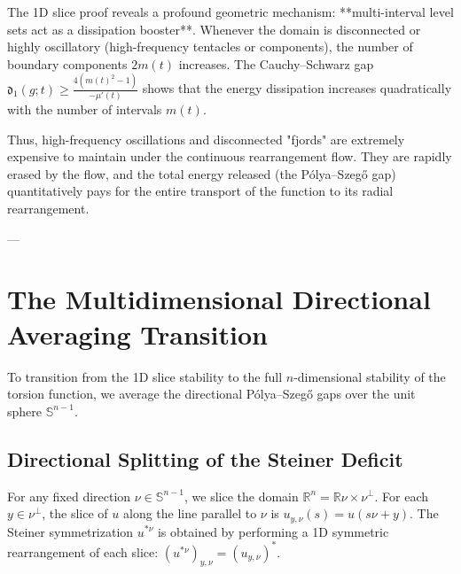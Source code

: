 \documentclass[11pt]{article}
\theoremstyle{definition}
\newcommand{\R}{\mathbb R}
\newcommand{\Sph}{\mathbb S^{n-1}}
\begin{document}
The 1D slice proof reveals a profound geometric mechanism: **multi-interval level sets act as a dissipation booster**. Whenever the domain is disconnected or highly oscillatory (high-frequency tentacles or components), the number of boundary components $2m(t)$ increases. The Cauchy--Schwarz gap $\mathfrak{d}_1(g; t) \ge \frac{4(m(t)^2-1)}{-\mu'(t)}$ shows that the energy dissipation increases quadratically with the number of intervals $m(t)$. 

Thus, high-frequency oscillations and disconnected "fjords" are extremely expensive to maintain under the continuous rearrangement flow. They are rapidly erased by the flow, and the total energy released (the Pólya--Szegő gap) quantitatively pays for the entire transport of the function to its radial rearrangement.

---

\section{The Multidimensional Directional Averaging Transition}

To transition from the 1D slice stability to the full $n$-dimensional stability of the torsion function, we average the directional Pólya--Szegő gaps over the unit sphere $\Sph$. 

\subsection{Directional Splitting of the Steiner Deficit}

For any fixed direction $\nu \in \Sph$, we slice the domain $\R^n = \R \nu \times \nu^\perp$. For each $y \in \nu^\perp$, the slice of $u$ along the line parallel to $\nu$ is $u_{y,\nu}(s) = u(s\nu + y)$. The Steiner symmetrization $u^{*\nu}$ is obtained by performing a 1D symmetric rearrangement of each slice: $(u^{*\nu})_{y,\nu} = (u_{y,\nu})^*$.
\end{document}
